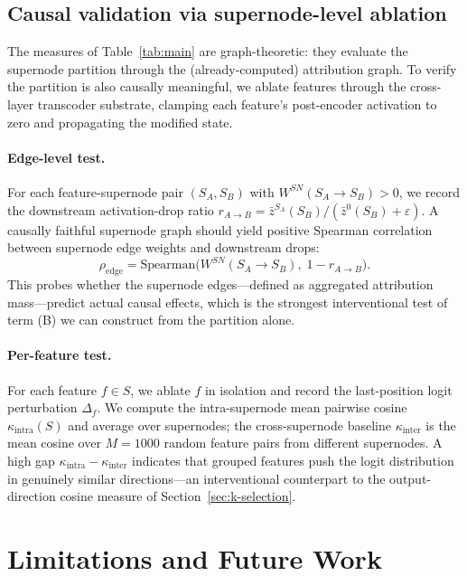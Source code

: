 \documentclass[table, 11pt]{article}
\begin{document}
\subsection{Causal validation via supernode-level ablation}\label{sec:causal-validation}

The measures of Table~\ref{tab:main} are graph-theoretic: they
evaluate the supernode partition through the (already-computed)
attribution graph. To verify the partition is also causally
meaningful, we ablate features through the cross-layer transcoder
substrate, clamping each feature's post-encoder activation to zero
and propagating the modified state.

\paragraph{Edge-level test.}
For each feature-supernode pair $(S_A, S_B)$ with
$W^{SN}(S_A \to S_B) > 0$, we record the downstream activation-drop
ratio $r_{A \to B} = \bar z^{S_A}(S_B) / (\bar z^0(S_B) + \varepsilon)$.
A causally faithful supernode graph should yield positive Spearman
correlation between supernode edge weights and downstream drops:
\begin{equation}
\rho_{\text{edge}} = \mathrm{Spearman}\bigl(W^{SN}(S_A \to S_B),\; 1 - r_{A \to B}\bigr).
\label{eq:rho-edge}
\end{equation}
This probes whether the supernode edges---defined as aggregated
attribution mass---predict actual causal effects, which is the
strongest interventional test of term (B) we can construct from the
partition alone.

\paragraph{Per-feature test.}
For each feature $f \in S$, we ablate $f$ in isolation and record the
last-position logit perturbation $\Delta_f$. We compute the
intra-supernode mean pairwise cosine $\kappa_{\text{intra}}(S)$ and
average over supernodes; the cross-supernode baseline $\kappa_{\text{inter}}$
is the mean cosine over $M=1000$ random feature pairs from different
supernodes. A high gap $\kappa_{\text{intra}} - \kappa_{\text{inter}}$
indicates that grouped features push the logit distribution in
genuinely similar directions---an interventional counterpart to the
output-direction cosine measure of Section~\ref{sec:k-selection}.

\section{Limitations and Future Work}\label{sec:limitations}
\end{document}

